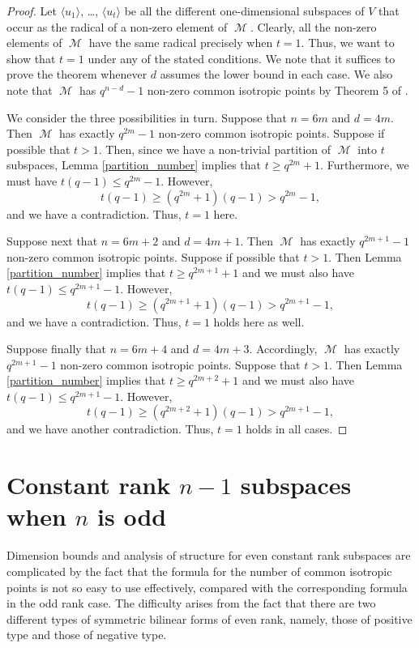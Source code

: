 \documentclass{amsart}
\DeclareMathOperator{\M}{\mathcal{M}}
\theoremstyle{plain}
\theoremstyle{definition}
\begin{document}
\begin{proof}
 Let $\langle u_1\rangle$, \dots, $\langle u_t\rangle$ be all the different one-dimensional subspaces of $V$ that occur as the radical of a non-zero element of $\M$. Clearly, all the non-zero elements of $\M$ have the same radical precisely when $t=1$. Thus, we want to show that
$t=1$ under any of the stated conditions. We note that it suffices to prove the theorem whenever $d$ assumes the lower bound in each case.
We also note that $\M$ has $q^{n-d}-1$ non-zero common isotropic points by Theorem 5 of \cite{DGS}.

We consider the three possibilities in turn. Suppose that $n=6m$ and $d=4m$. Then $\M$ has exactly $q^{2m}-1$ non-zero common isotropic points. Suppose
if possible that $t>1$. Then, since we have a non-trivial partition of $\M$ into
$t$ subspaces, Lemma \ref{partition_number} implies that $t\geq q^{2m}+1$. Furthermore, we must have $t(q-1)\leq q^{2m}-1$. However,
\[
 t(q-1)\geq (q^{2m}+1)(q-1)>q^{2m}-1,
\]
and we have a contradiction. Thus, $t=1$ here.

Suppose next that $n=6m+2$ and $d=4m+1$. Then $\M$ has exactly $q^{2m+1}-1$ non-zero common isotropic points. Suppose
if possible that $t>1$. Then
Lemma \ref{partition_number} implies that $t\geq q^{2m+1}+1$ and  we must also have $t(q-1)\leq q^{2m+1}-1$. However,
\[
 t(q-1)\geq (q^{2m+1}+1)(q-1)>q^{2m+1}-1,
\]
and we have a contradiction. Thus, $t=1$ holds here as well.

Suppose finally that $n=6m+4$ and $d=4m+3$. Accordingly, $\M$ has exactly $q^{2m+1}-1$ non-zero common isotropic points. Suppose
that $t>1$. Then
Lemma \ref{partition_number} implies that $t\geq q^{2m+2}+1$ and  we must also have $t(q-1)\leq q^{2m+1}-1$. However,
\[
 t(q-1)\geq (q^{2m+2}+1)(q-1)>q^{2m+1}-1,
\]
and we have another contradiction. Thus, $t=1$ holds in all cases.

\end{proof}

\section{Constant rank $n-1$ subspaces when $n$ is odd}

\noindent Dimension bounds and analysis of structure for even constant rank subspaces are complicated by the fact that the formula for the number of common isotropic points is not so easy to use effectively, compared with the corresponding formula in the odd rank case. The difficulty arises from the fact that there are two different types of symmetric bilinear forms of even rank, namely, those of positive type and those of negative type.
\end{document}

